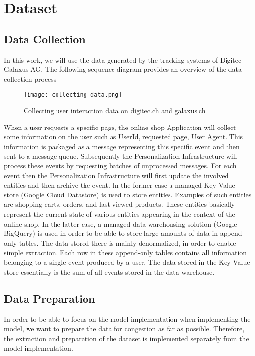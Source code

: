 \chapter{Dataset}\label{sec:dataset}

\section{Data Collection}
In this work, we will use the data generated by the tracking systems of Digitec Galaxus AG.
The following sequence-diagram provides an overview of the data collection process.
\begin{figure}[H]
	\centering
    \captionsetup{width=0.8\textwidth}
    \texttt{[image: collecting-data.png]}
    \caption{Collecting user interaction data on digitec.ch and galaxus.ch}
    \label{fig:collecting_data}
\end{figure}
When a user requests a specific page, the online shop Application will collect some information on the user such as UserId, requested page, User Agent.
This information is packaged as a message representing this specific event and then sent to a message queue.
Subsequently the Personalization Infrastructure will process these events by requesting batches of unprocessed messages.
For each event then the Personalization Infrastructure will first update the involved entities and then archive the event.
In the former case a managed Key-Value store (Google Cloud Datastore) is used to store entities.
Examples of such entities are shopping carts, orders, and last viewed products.
These entities basically represent the current state of various entities appearing in the context of the online shop.
In the latter case, a managed data warehousing solution (Google BigQuery) is used in order to be able to store large amounts of data in append-only tables.
The data stored there is mainly denormalized, in order to enable simple extraction.
Each row in these append-only tables contains all information belonging to a single event produced by a user.
The data stored in the Key-Value store essentially is the sum of all events stored in the data warehouse.

\section{Data Preparation}
In order to be able to focus on the model implementation when implementing the model, we want to prepare the data for congestion as far as possible.
Therefore, the extraction and preparation of the dataset is implemented separately from the model implementation.
